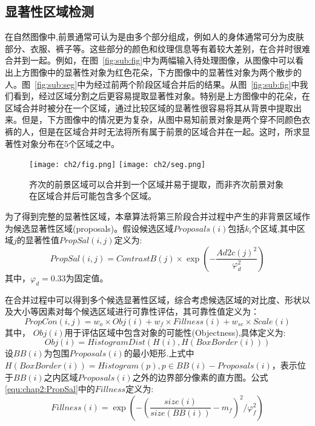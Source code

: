 \par
\subsection{显著性区域检测}
\label{subsec:saliency}

在自然图像中,前景通常可认为是由多个部分组成，例如人的身体通常可分为皮肤部分、衣服、裤子等。这些部分的颜色和纹理信息等有着较大差别，在合并时很难合并到一起。例如，在图~\ref{fig:sub:fig}中为两幅输入待处理图像，从图像中可以看出上方图像中的显著性对象为红色花朵，下方图像中的显著性对象为两个散步的人。图~\ref{fig:sub:seg}中为经过前两个阶段区域合并后的结果。从图~\ref{fig:sub:fig}中我们看到，经过区域分割之后更容易提取显著性对象。特别是上方图像中的花朵，在区域合并时被分在一个区域，通过比较区域的显著性很容易将其从背景中提取出来。但是，下方图像中的情况更为复杂，从图中易知前景对象是两个穿不同颜色衣裤的人，但是在区域合并时无法将所有属于前景的区域合并在一起。这时，所求显著性对象分布在5个区域之中。

\begin{figure}[htb]
  \centering%
    {\texttt{[image: ch2/fig.png]}}%
 \hspace{1em}%
      {\texttt{[image: ch2/seg.png]}}

  \caption{齐次的前景区域可以合并到一个区域并易于提取，而非齐次前景对象在区域合并后可能包含多个区域。}
  \label{fig:fgseg}
\end{figure}

\par
为了得到完整的显著性区域，本章算法将第三阶段合并过程中产生的非背景区域作为候选显著性区域(proposals)。假设候选区域$Proposals(i)$包括$k_i$个区域,其中区域$j$的显著性值$PropSal(i,j)$定义为:
$$
   PropSal(i,j)=ContrastB(j) \times \exp{(-\frac{Ad2c(j)^2}{\varphi_d^2 })}
$$
其中，$\varphi_d=0.33$为固定值。\par
在合并过程中可以得到多个候选显著性区域，综合考虑候选区域的对比度、形状以及大小等因素对每个候选区域进行可靠性评估，其可靠性值定义为：
\begin{equation}
   \label{equ:chap2:PropSal}
   PropCon(i,j)=w_o \times Obj(i) + w_f \times Fillness(i) + w_{sc} \times Scale(i)
\end{equation}
其中， $Obj(i)$用于评估区域中包含对象的可能性(Objectness)\cite{objectness},具体定义为:
$$Obj(i) = HistogramDist(H(i),H(BoxBorder(i)))$$
设$BB(i)$为包围$Proposals(i)$的最小矩形.上式中$H(BoxBorder(i))=Histogram(p), p \in BB(i)-Proposals(i)$，表示位于$BB(i)$之内区域$Proposals(i)$之外的边界部分像素的直方图。公式\ref{equ:chap2:PropSal}中的$Fillness$定义为:
$$ Fillness(i) = \exp({-(\frac{size(i)}{size(BB(i))}-m_f)^2}/\varphi_f^2)$$ \par

